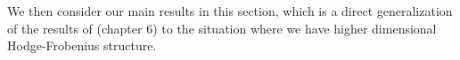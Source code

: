 \documentclass[12pt]{amsart}
\newtheorem{theorem}{Theorem}[section]
\newtheorem{lemma}[theorem]{Lemma}
\theoremstyle{definition}
\numberwithin{equation}{section}
\begin{document}
%
%












\indent We then consider our main results in this section, which is a direct generalization of the results of \cite{KPX} (chapter 6) to the situation where we have higher dimensional Hodge-Frobenius structure. 

\end{document}
